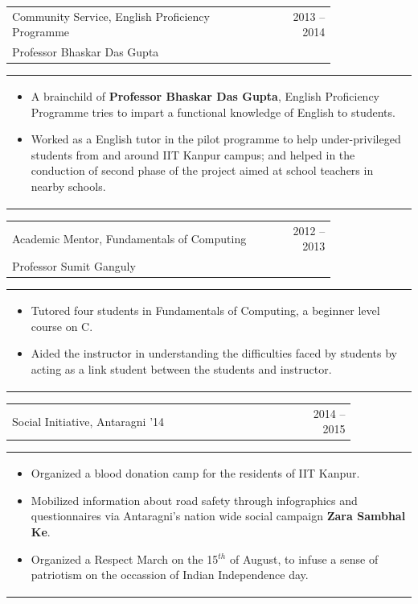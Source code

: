 \documentclass[a4paper,10pt]{article} %
\newcommand{\lproject}[4]{
    \begin{tabular}{p{0.80\linewidth}r}
        \textcolor{NavyBlue}{#2} & \multicolumn{1}{m{4cm}}{\raggedleft \textsc{#1}}\\
        #3
    \end{tabular}
    \begin{tabular}{p{\linewidth}}
    \vspace{-0.3cm}
        \footnotesize{#4}
    \end{tabular}
    \vspace{-0.5cm}
}
\newcommand{\iproject}[3]{
    \begin{tabular}{p{0.85\linewidth}r}
        \textcolor{NavyBlue}{#2} & \multicolumn{1}{m{3cm}}{\raggedleft \textsc{#1}}\\
    \end{tabular}
    \begin{tabular}{p{\linewidth}}
    \vspace{-0.3cm}
        \footnotesize{#3}
    \end{tabular}
    \vspace{-0.5cm}
}
\begin{document}
\lproject {2013 -- 2014}
          {Community Service, English Proficiency Programme}
          {Professor Bhaskar Das Gupta}
          {
               \begin{itemize}[leftmargin=0.5cm]
                   \item A brainchild of \textbf{Professor Bhaskar Das Gupta}, English Proficiency Programme
                       tries to impart a functional knowledge of English to students.
                   \item Worked as a English tutor in the pilot programme to help under-privileged students from
                       and around IIT Kanpur campus; and helped in the conduction of second phase of the project
                       aimed at school teachers in nearby schools.
               \end{itemize}
          }

\lproject {2012 -- 2013}
          {Academic Mentor, Fundamentals of Computing}
          {Professor Sumit Ganguly}
          {
               \begin{itemize}[leftmargin=0.5cm]
                   \item Tutored four students in Fundamentals of Computing, a beginner level course on C.
                   \item Aided the instructor in understanding the difficulties faced by students by acting as a link
                       student between the students and instructor.
               \end{itemize}
          }

\iproject {2014 -- 2015}
          {Social Initiative, Antaragni '14}
          {
               \begin{itemize}[leftmargin=0.5cm]
                   \item Organized a blood donation camp for the residents of IIT Kanpur.
                   \item Mobilized information about road safety through infographics and questionnaires
                       via Antaragni's nation wide social campaign \textbf{Zara Sambhal Ke}.
                   \item Organized a Respect March on the 15$^{th}$ of August, to infuse a sense of patriotism
                       on the occassion of Indian Independence day.
               \end{itemize}
          }
\end{document}
